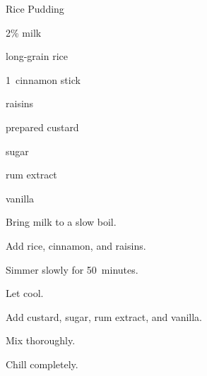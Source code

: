 \begin{recipe}{Rice Pudding}{}{}

\begin{ingredients}
\item {} 2\% milk
\item {} long-grain rice
\item 1~cinnamon stick
\item \C{\quarter} raisins
\item \C{\third} prepared custard
\item \C{\third} sugar
\item {} rum extract
\item {} vanilla
\end{ingredients}

\begin{directions}
\item Bring milk to a slow boil.
\item Add rice, cinnamon, and raisins.
\item Simmer slowly for 50~minutes.
\item Let cool.
\item Add custard, sugar, rum extract, and vanilla.
\item Mix thoroughly.
\item Chill completely.
\end{directions}

\end{recipe}

